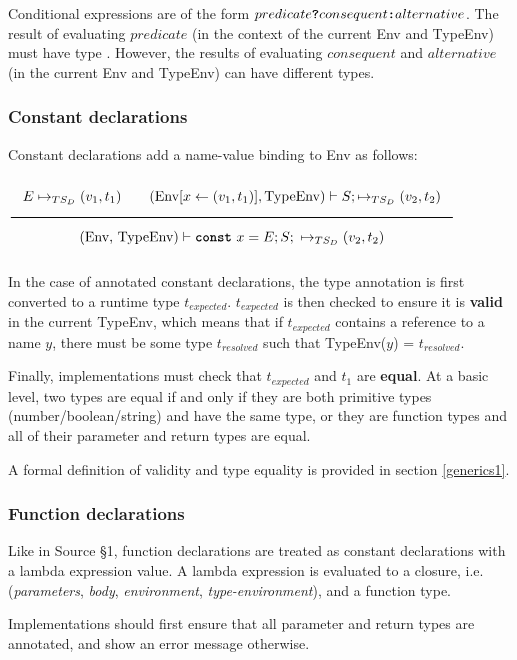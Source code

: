 Conditional expressions are of the form $predicate \textbf{\texttt{?}} consequent \textbf{\texttt{:}} alternative$.
The result of evaluating $predicate$ (in the context of the current Env and TypeEnv) must have type . 
However, the results of evaluating $consequent$ and $alternative$ (in the current Env and TypeEnv) can have different types.


\subsubsection*{Constant declarations}

Constant declarations add a name-value binding to Env as follows:

\begin{center}
$\Rule{E \Eval (v_1, t_1) \qquad (\textrm{Env}[x \leftarrow (v_1, t_1)], \textrm{TypeEnv}) \vdash S; \Eval (v_2, t_2)}{(\textrm{Env, TypeEnv}) \vdash \Const\ x = E; S;\ \Eval (v_2, t_2)}$
\end{center}

In the case of annotated constant declarations, the type annotation is first converted to a runtime type $t_{expected}$. 
$t_{expected}$ is then checked to ensure it is \textbf{valid} in the current TypeEnv, which means that if $t_{expected}$ contains a reference to a name $y$, there must be some type $t_{resolved}$ such that TypeEnv($y$) = $t_{resolved}$.

Finally, implementations must check that $t_{expected}$ and $t_1$ are \textbf{equal}.
At a basic level, two types are equal if and only if they are both primitive types (number/boolean/string) and have the same type, or they are function types and all of their parameter and return types are equal.

A formal definition of validity and type equality is provided in section \ref{generics1}.


\subsubsection*{Function declarations}

Like in Source \S 1, function declarations are treated as constant declarations with a lambda expression value. A lambda expression is evaluated to a closure, i.e. (\textit{parameters}, \textit{body}, \textit{environment}, \textit{type-environment}), and a function type. 

Implementations should first ensure that all parameter and return types are annotated, and show an error message otherwise.

